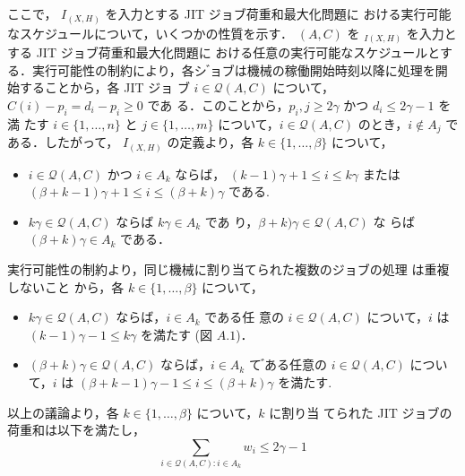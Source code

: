 \documentclass[12pt]{optlab-bachelor}
\begin{document}
ここで， $I_{(X,H)}$ を入力とする JIT ジョブ荷重和最大化問題に
おける実行可能なスケジュールについて，いくつかの性質を示す．
$(A, C)$ を $_{I(X,H)}$ を入力とする JIT ジョブ荷重和最大化問題に
おける任意の実行可能なスケジュールとする．実行可能性の制約により，各シ
゙ョブは機械の稼働開始時刻以降に処理を開始することから，各 JIT ジョ
ブ $i \in \mathcal{Q}(A,C)$ について，$C(i) − p_i = d_i − p_i \ge 0$ であ
る．このことから，$p_i,j \ge 2\gamma$ かつ $d_i \le 2\gamma − 1$ を満
たす $i \in \{1,\ldots,n\}$ と $j \in \{1,\ldots,m\}$ について，$i \in
\mathcal{Q}(A,C)$ のとき，$i \notin A_j$ である．したがって，
$I_{(X,H)}$ の定義より，各 $k \in \{1,\ldots,\beta\}$ について，
\begin{itemize}
  \item $i \in \mathcal{Q}(A,C)$ かつ $i \in A_k$ ならば，
  $(k − 1)\gamma + 1 \le i \le k\gamma$ または $(\beta + k − 1)\gamma +
  1 \le i \le (\beta + k)\gamma$ である.
  \item $k\gamma \in \mathcal{Q}(A,C)$ ならば $k\gamma \in A_k$ であ
  り，$\beta + k)\gamma \in \mathcal{Q}(A,C)$ な
  らば $(\beta + k)\gamma \in A_k$ である．
\end{itemize}
実行可能性の制約より，同じ機械に割り当てられた複数のジョブの処理
は重複しないこと から，各 $k \in \{1,\ldots,\beta\}$ について，
\begin{itemize}
  \item $k\gamma \in \mathcal{Q}(A,C)$ ならば，$i \in A_k$ である任
  意の $i \in \mathcal{Q}(A,C)$ について，$i$ は \\$(k − 1)\gamma− 1
  \le k\gamma$ を満たす (図 $A.1$)．
  \item $(\beta + k)\gamma \in \mathcal{Q}(A,C)$ ならば，$i \in A_k$ て
  ゙ある任意の $i \in \mathcal{Q}(A,C)$ について，$i$ は
  $(\beta + k − 1)\gamma − 1 \le i \le (\beta + k)\gamma$ を満たす.
\end{itemize}
以上の議論より，各 $k \in \{1,\ldots, \beta \}$ について，$k$ に割り当
てられた JIT ジョブの荷重和は以下を満たし，
$$\sum_{i \in \mathcal{Q}(A,C):i \in A_k}w_i \le
2\gamma - 1 \label{A.1}$$
\end{document}
